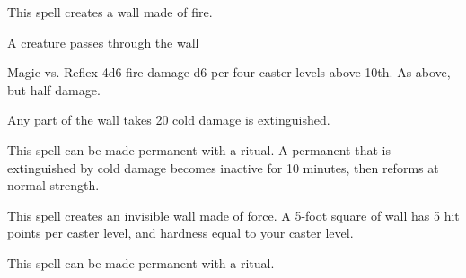 \begin{spellheader}
    \spelldur{\durshort}
\end{spellheader}
\begin{spelleffects}
    \spelleffect This spell creates a wall made of fire.
    \begin{spelltrigger}{A creature passes through the wall}
        \begin{spellattack}{Magic vs. Reflex}
            \spellsuccess 4d6 fire damage \add d6 per four caster levels above 10th.
            \spellfailure As above, but half damage.
        \end{spellattack}
    \end{spelltrigger}
\end{spelleffects}
\begin{spellfooter}
    \spellnotes Any part of the wall takes 20 cold damage is extinguished.

    This spell can be made permanent with a  ritual. A permanent  that is extinguished by cold damage becomes inactive for 10 minutes, then reforms at normal strength.
\end{spellfooter}

\begin{spellheader}
    \spelldur{\durshort \dismissable}
\end{spellheader}
\begin{spelleffects}
    \spelleffect This spell creates an invisible wall made of force. A 5-foot square of wall has 5 hit points per caster level, and hardness equal to your caster level.
\end{spelleffects}
\begin{spellfooter}
    \spellnotes \forcespellnotes

    This spell can be made permanent with a  ritual.
\end{spellfooter}


